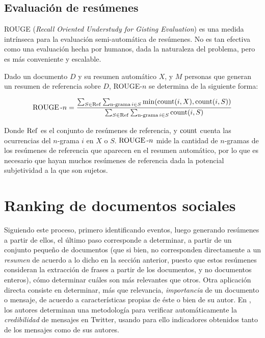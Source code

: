 \subsection{Evaluación de resúmenes}
\label{sec-2.4.1}


    ROUGE (\emph{Recall Oriented Understudy for Gisting Evaluation})\cite{Lin:2003:AES:1073445.1073465}
    es una medida intrínseca para la evaluación semi-automática de
    resúmenes. No es tan efectiva como una evaluación hecha por
    humanos, dada la naturaleza del problema, pero es más conveniente
    y escalable.

    Dado un documento $D$ y su resumen automático $X$, y $M$ personas
    que generan un resumen de referencia sobre $D$, ROUGE-$n$ se
    determina de la siguiente forma:

    $$\operatorname{ROUGE}\text{-}n = \frac{  \sum_{S \in \operatorname{Ref}} \sum_{\operatorname{n-grama} i \in S} \operatorname{min}( \operatorname{count}(i,X),\operatorname{count}(i,S) )   }{ \sum_{S\in \operatorname{Ref}}\sum_{\operatorname{n-grama} i \in S}  \operatorname{count}(i,S) }$$

    Donde $\operatorname{Ref}$ es el conjunto de resúmenes de referencia, y
    $\operatorname{count}$ cuenta las ocurrencias del $n$-grama $i$ en $X$ o
    $S$. $\operatorname{ROUGE}\text{-}n$ mide la cantidad de $n$-gramas de los
    resúmenes de referencia que aparecen en el resumen automático, por
    lo que es necesario que hayan muchos resúmenes de referencia dada
    la potencial subjetividad a la que son sujetos.

\section{Ranking de documentos sociales}
\label{sec-2.5}


   Siguiendo este proceso, primero identificando eventos, luego
   generando resúmenes a partir de ellos, el último paso corresponde a
   determinar, a partir de un conjunto pequeño de documentos (que si
   bien, no corresponden directamente a un \emph{resumen} de acuerdo a lo
   dicho en la sección anterior, puesto que estos resúmenes consideran
   la extracción de frases a partir de los documentos, y no documentos
   enteros), cómo determinar cuáles son más relevantes que otros. Otra
   aplicación directa consiste en determinar, más que relevancia,
   \emph{importancia} de un documento o mensaje, de acuerdo a
   características propias de éste o bien de su autor. En
   \cite{Castillo:2011:ICT:1963405.1963500}, los autores determinan
   una metodología para verificar automáticamente la \emph{credibilidad} de
   mensajes en Twitter, usando para ello indicadores obtenidos tanto
   de los mensajes como de sus autores.

